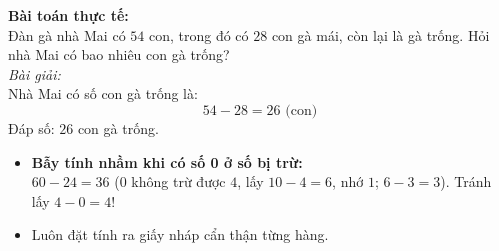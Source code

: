 \documentclass[11pt,a4paper]{article}
\begin{document}
\vspace{-1.5mm}
\noindent
\begin{minipage}[t]{0.49\textwidth}\vspace{0pt}
\begin{tcolorbox}[
  enhanced,
  colback=green!4!white,
  colframe=green!60!black,
  arc=2mm, boxrule=0.8pt,
  left=2mm, right=2mm, top=1.8mm, bottom=1.8mm,
  title={\footnotesize\bfseries\color{white}\faCheckCircle\ 4. Ví dụ thực hành chuẩn mực}
]
{\footnotesize
\textbf{Bài toán thực tế:}\\
Đàn gà nhà Mai có $54$ con, trong đó có $28$ con gà mái, còn lại là gà trống. Hỏi nhà Mai có bao nhiêu con gà trống?\\
\textit{Bài giải:}\\
Nhà Mai có số con gà trống là:
$$54 - 28 = 26\text{ (con)}$$
Đáp số: $26$ con gà trống.
}
\end{tcolorbox}
\end{minipage}
\hfill
\begin{minipage}[t]{0.49\textwidth}\vspace{0pt}
\begin{tcolorbox}[
  enhanced,
  colback=red!4!white,
  colframe=red!75!black,
  arc=2mm, boxrule=0.8pt,
  left=2mm, right=2mm, top=1.8mm, bottom=1.8mm,
  title={\footnotesize\bfseries\color{white}\faExclamationTriangle\ 5. Mẹo tránh bẫy trắc nghiệm}
]
{\footnotesize
\begin{itemize}\setlength{\itemsep}{1pt}\setlength{\leftskip}{-2.5mm}
  \item \textbf{Bẫy tính nhầm khi có số 0 ở số bị trừ:}\\
  $60 - 24 = 36$ ($0$ không trừ được $4$, lấy $10 - 4 = 6$, nhớ $1$; $6 - 3 = 3$). Tránh lấy $4 - 0 = 4$!
  \item Luôn đặt tính ra giấy nháp cẩn thận từng hàng.
\end{itemize}
}
\end{tcolorbox}
\end{minipage}
\end{document}
